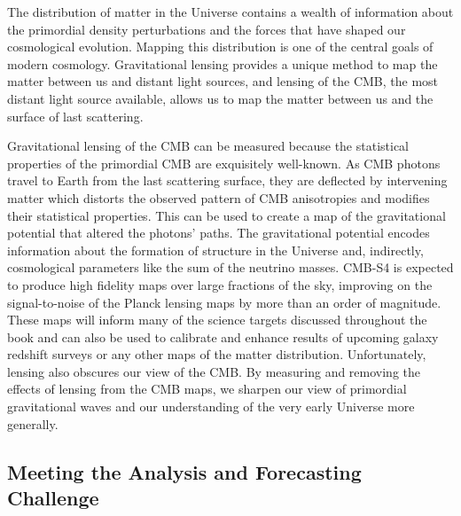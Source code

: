 The distribution of matter in the Universe contains a wealth of information about the primordial density perturbations and the forces that have shaped our cosmological evolution. Mapping this distribution is one of the central goals of modern cosmology. Gravitational lensing provides a unique method to map the matter between us and distant light sources, and lensing of the CMB, the most distant light source available, allows us to map the matter between us and the surface of last scattering.

Gravitational lensing of the CMB can be measured because the statistical properties of the primordial CMB are exquisitely well-known. As CMB photons travel to Earth from the last scattering surface, they are deflected by intervening matter which distorts the observed pattern of CMB anisotropies and modifies their statistical properties. This can be used to create a map of the gravitational potential that altered the photons' paths. The gravitational potential encodes information about the formation of structure in the Universe and, indirectly, cosmological parameters like the sum of the neutrino masses.  CMB-S4 is expected to produce high fidelity maps over large fractions of the sky, improving on the signal-to-noise of  the Planck lensing maps by more than an order of magnitude.  These maps will inform many of the science targets discussed throughout the book and can also be used to calibrate and enhance results of upcoming galaxy redshift surveys or any other maps of the matter distribution.  Unfortunately, lensing also obscures our view of the CMB.  By measuring and removing the effects of lensing from the CMB maps, we sharpen our view of primordial gravitational waves and our understanding of the very early Universe more generally.  

\subsection*{Meeting the Analysis and Forecasting Challenge}

